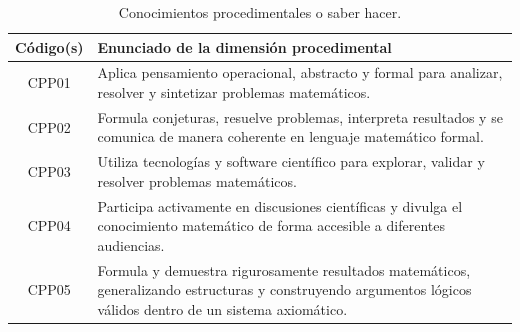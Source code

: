 
\begin{table}[H]
\centering
\renewcommand{\arraystretch}{1.3}
\begin{tabular}{|c|p{9cm}|}
\hline
\cellcolor[HTML]{00C0F3}\textbf{Código(s)}  & \cellcolor[HTML]{00C0F3}\textbf{Enunciado de la dimensión procedimental} \\
\hline
CPP01 & Aplica pensamiento operacional, abstracto y formal para analizar, resolver y sintetizar problemas matemáticos. \\
\hline
CPP02 & Formula conjeturas, resuelve problemas, interpreta resultados y se comunica de manera coherente en lenguaje matemático formal. \\
\hline
CPP03 & Utiliza tecnologías y software científico para explorar, validar y resolver problemas matemáticos.\\
\hline
CPP04 & Participa activamente en discusiones científicas y divulga el conocimiento matemático de forma accesible a diferentes audiencias.\\
\hline
CPP05 & Formula y demuestra rigurosamente resultados matemáticos, generalizando estructuras y construyendo argumentos lógicos válidos dentro de un sistema axiomático.\\
\hline
\end{tabular}
\caption{Conocimientos procedimentales o saber hacer.}
\label{tab:procedimental-egreso-integrada}
\end{table}

